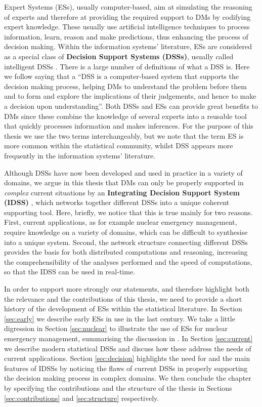 Expert Systems (ESs), usually computer-based, aim at simulating the reasoning of experts and therefore at providing the required support to DMs by codifying expert knowledge. These usually use artificial intelligence techniques to process information, learn, reason and make predictions, thus enhancing the process of decision making. Within the information systems' literature, ESs are considered as a special class of \textbf{Decision Support Systems (DSSs)}, usually called intelligent DSSs \citep{Marakas2003}. There is a large number of definitions of what a DSS is. Here we follow \citet{French2009} saying that a ``DSS is a computer-based system that supports the decision making process, helping DMs to understand the problem before them and to form and explore the implications of their judgements, and hence to make a decision upon understanding''. Both DSSs and ESs can provide great benefits to DMs since these combine the knowledge of several experts into a reusable tool that quickly processes information and makes inferences. For the purpose of this thesis we use the two terms interchangeably, but we note that the term ES is more common within the statistical community, whilst DSS appears more frequently in the information systems' literature.

Although DSSs have now been developed and used in practice in a variety of domains, we argue in this thesis that  DMs can only be properly supported in \textit{complex} current situations by an \textbf{Integrating Decision Support System (IDSS)} \citep{Leonelli2015,Smith2015}, which networks together different DSSs into a unique coherent supporting tool. Here, briefly, we notice that this is true mainly for two reasons. First, current applications, as for example nuclear emergency management, require knowledge on a variety of domains, which can be difficult to synthesise into a unique system. Second, the network structure connecting different DSSs provides the basis for both distributed computations and reasoning, increasing the comprehensibility of the analyses performed and the speed of computations, so that the IDSS can be used in real-time. 

In order to support more strongly our statements, and therefore highlight both the relevance and the contributions of this thesis, we need to provide a short history of the development of ESs within the statistical literature. In Section \ref{sec:early} we describe early ESs in use in the last century. We  take a little digression in Section \ref{sec:nuclear} to illustrate the use of ESs for nuclear emergency management, summarising the discussion in \citet{Leonelli2013}. In Section \ref{sec:current} we describe modern statistical DSSs and discuss how these address the needs of current applications. Section \ref{sec:decision} highlights the need for and the main features of IDSSs  by noticing the flaws of current DSSs in properly supporting the decision making process in complex domains. We then conclude the chapter by specifying the contributions and the structure of the thesis in Sections \ref{sec:contributions} and \ref{sec:structure} respectively. 
    
